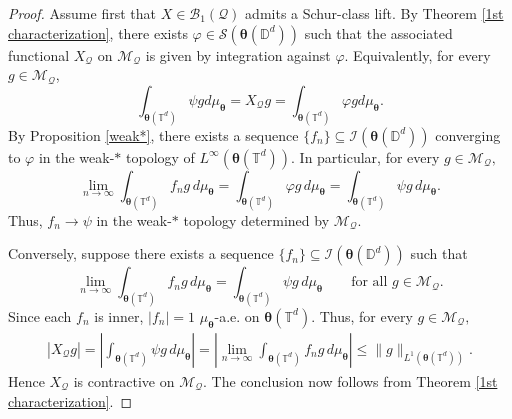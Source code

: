 \documentclass[12pt,reqno]{amsart}
\theoremstyle{remark}
\theoremstyle{definition}
\newcommand{\beqn}{\begin{eqnarray*}}
\newcommand{\eeqn}{\end{eqnarray*}}
\begin{document}
\begin{proof}
    Assume first that $X\in \mathcal{B}_1(\mathcal{Q})$ admits a Schur-class lift. By Theorem \ref{1st characterization}, there exists $\varphi \in \mathcal{S}(\boldsymbol \theta(\mathbb D^d))$ such that the associated functional $X_{\mathcal{Q}}$ on $\mathcal{M}_{\mathcal{Q}}$ is given by integration against $\varphi.$ Equivalently, for every $g\in \mathcal{M}_{\mathcal{Q}}$, $$\int_{ \boldsymbol \theta(\mathbb T^d)} \psi g d\mu_{\boldsymbol \theta}=X_{\mathcal{Q}} g=\int_{\boldsymbol \theta(\mathbb T^d)} \varphi g d\mu_{\boldsymbol \theta}.$$   
    By Proposition \ref{weak*}, there exists a sequence $\{f_n\}\subseteq \mathcal{I}(\boldsymbol \theta(\mathbb D^d))$ converging to $ \varphi$ in the weak-$*$ topology of $L^\infty(\boldsymbol \theta(\mathbb T^d)).$ In particular, for every $g\in \mathcal{M}_{\mathcal{Q}},$
    $$\lim_{n\to\infty}\int_{\boldsymbol \theta(\mathbb T^d)} f_n g\, d\mu_{\boldsymbol \theta}
    =\int_{\boldsymbol \theta(\mathbb T^d)} \varphi g\, d\mu_{\boldsymbol \theta}
    =\int_{\boldsymbol \theta(\mathbb T^d)} \psi g\, d\mu_{\boldsymbol \theta}.$$
    Thus, $f_n \to \psi$ in the weak-$*$ topology determined by $\mathcal{M}_{\mathcal{Q}}.$
    
    Conversely, suppose there exists a sequence $\{f_n\}\subseteq \mathcal{I}(\boldsymbol \theta(\mathbb D^d))$ such that
    $$\lim_{n\to\infty}\int_{\boldsymbol \theta(\mathbb T^d)} f_n g\, d\mu_{\boldsymbol \theta}
    =\int_{\boldsymbol \theta(\mathbb T^d)} \psi g\, d\mu_{\boldsymbol \theta}
    \qquad \text{for all } g\in \mathcal{M}_{\mathcal{Q}}.$$
    Since each $f_n$ is inner, $|f_n|=1$ $\mu_{\boldsymbol \theta}$-a.e. on $\boldsymbol \theta(\mathbb T^d)$.
    Thus, for every $g\in \mathcal{M}_{\mathcal{Q}},$
   \beqn 
        |X_{\mathcal{Q}}g|
        = \left|\int_{\boldsymbol \theta(\mathbb T^d)} \psi g\, d\mu_{\boldsymbol \theta}\right|= \left|\lim_{n\to\infty}\int_{\boldsymbol \theta(\mathbb T^d)} f_n g \, d\mu_{\boldsymbol \theta}\right|
        \leq\|g\|_{L^1(\boldsymbol \theta(\mathbb T^d))}. 
    \eeqn
    Hence $X_{\mathcal Q}$ is contractive on $\mathcal M_{\mathcal Q}.$ The conclusion now follows from Theorem \ref{1st characterization}.
    \end{proof}
    
\end{document}
